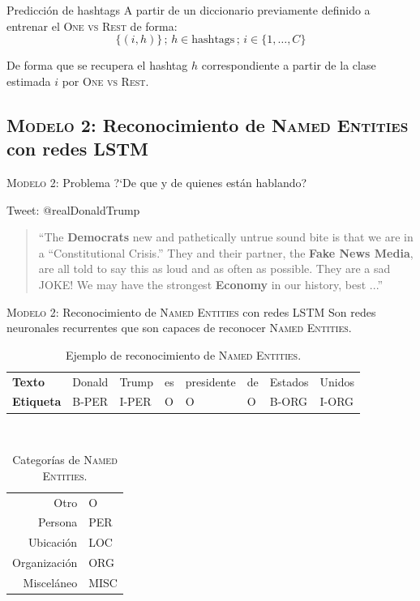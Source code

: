 \documentclass[10pt]{beamer}
\begin{document}
\begin{frame}{Predicción de hashtags}
  A partir de un diccionario previamente definido a entrenar el \textsc{One vs Rest} de forma:
  \begin{equation*}
    \{(i, h)\} \,;\, h \in \text{hashtags} \,;\, i \in \{1, \ldots, C\}
  \end{equation*}

  De forma que se recupera el hashtag $h$ correspondiente a partir de la clase estimada $i$ por \textsc{One vs Rest}.
\end{frame}

\subsection{\textsc{Modelo 2:} Reconocimiento de \textsc{Named Entities} con redes \textsc{LSTM}}

\begin{frame}{\textsc{Modelo 2:} Problema}
  \alert{?`De que y de quienes están hablando?}
  
\begin{alertblock}{Tweet: @realDonaldTrump}
  \begin{quote}
    ``The \textbf{Democrats} new and pathetically untrue sound bite is that we are in a “Constitutional Crisis.” They and their partner, the \textbf{Fake News Media}, are all told to say this as loud and as often as possible. They are a sad JOKE! We may have the strongest \textbf{Economy} in our history, best ...''
  \end{quote}
\end{alertblock}
\end{frame}

\begin{frame}{\textsc{Modelo 2:} Reconocimiento de \textsc{Named Entities} con redes \textsc{LSTM}}
  Son redes neuronales recurrentes que son capaces de reconocer \textsc{Named Entities}.
  \begin{table}
    \centering
    \begin{tabular}{l|lllllll} 
      \textbf{Texto}    & Donald   & Trump & es & presidente & de & Estados & Unidos \\
      \textbf{Etiqueta} & B-PER    & I-PER & O  & O          & O  & B-ORG   & I-ORG
    \end{tabular}
    \\ [1em]
    \caption{Ejemplo de reconocimiento de \textsc{Named Entities}.}
    \label{table:namedent-example}
  \end{table}

  \begin{table}
    \centering
    \begin{tabular}{rl} 
      Otro & O \\
      Persona & PER \\
      Ubicación & LOC \\
      Organización & ORG \\
      Misceláneo & MISC \\
    \end{tabular}
    \caption{Categorías de \textsc{Named Entities}.}
    \label{table:namedent-categories}
  \end{table}
\end{frame}
\end{document}
